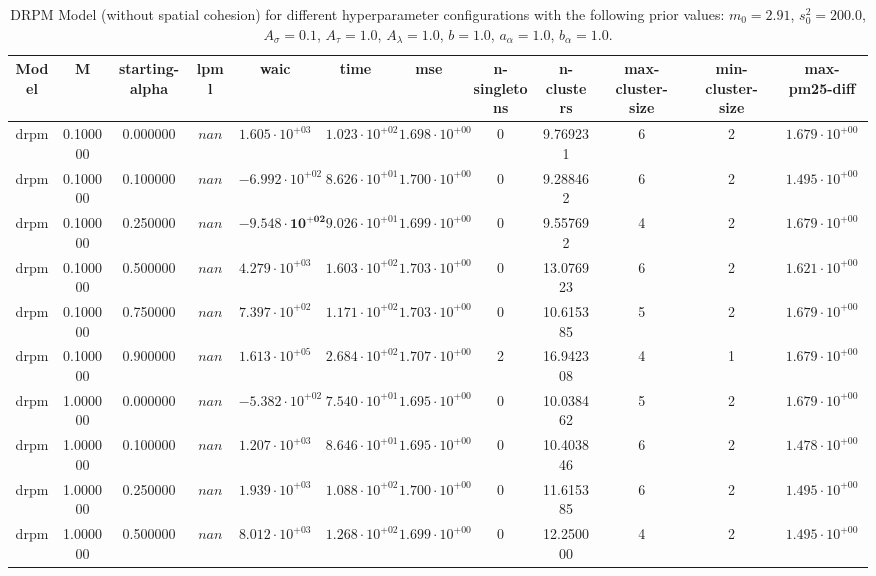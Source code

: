 \begin{table}
\caption{DRPM Model (without spatial cohesion) for different hyperparameter configurations with the following prior values: $m_0 = 2.91$, $s_0^2 = 200.0$, $A_\sigma = 0.1$, $A_\tau = 1.0$, $A_\lambda = 1.0$, $b = 1.0$, $a_\alpha = 1.0$, $b_\alpha = 1.0$.}
\centering\begin{tabular}{cccccccccccc}
\toprule
Model & M & starting-alpha & lpml & waic & time & mse & n-singletons & n-clusters & max-cluster-size & min-cluster-size & max-pm25-diff \\
\midrule
drpm & 0.100000 & 0.000000 & $nan$ & $1.605 \cdot 10^{+03}$ & $1.023 \cdot 10^{+02}$ & $1.698 \cdot 10^{+00}$ & 0 & 9.769231 & 6 & 2 & $1.679 \cdot 10^{+00}$ \\
drpm & 0.100000 & 0.100000 & $nan$ & $-6.992 \cdot 10^{+02}$ & $8.626 \cdot 10^{+01}$ & $1.700 \cdot 10^{+00}$ & 0 & 9.288462 & 6 & 2 & $1.495 \cdot 10^{+00}$ \\
drpm & 0.100000 & 0.250000 & $nan$ & $\mathbf{-9.548 \cdot 10^{+02}}$ & $9.026 \cdot 10^{+01}$ & $1.699 \cdot 10^{+00}$ & 0 & 9.557692 & 4 & 2 & $1.679 \cdot 10^{+00}$ \\
drpm & 0.100000 & 0.500000 & $nan$ & $4.279 \cdot 10^{+03}$ & $1.603 \cdot 10^{+02}$ & $1.703 \cdot 10^{+00}$ & 0 & 13.076923 & 6 & 2 & $1.621 \cdot 10^{+00}$ \\
drpm & 0.100000 & 0.750000 & $nan$ & $7.397 \cdot 10^{+02}$ & $1.171 \cdot 10^{+02}$ & $1.703 \cdot 10^{+00}$ & 0 & 10.615385 & 5 & 2 & $1.679 \cdot 10^{+00}$ \\
drpm & 0.100000 & 0.900000 & $nan$ & $1.613 \cdot 10^{+05}$ & $2.684 \cdot 10^{+02}$ & $1.707 \cdot 10^{+00}$ & 2 & 16.942308 & 4 & 1 & $1.679 \cdot 10^{+00}$ \\
drpm & 1.000000 & 0.000000 & $nan$ & $-5.382 \cdot 10^{+02}$ & $7.540 \cdot 10^{+01}$ & $1.695 \cdot 10^{+00}$ & 0 & 10.038462 & 5 & 2 & $1.679 \cdot 10^{+00}$ \\
drpm & 1.000000 & 0.100000 & $nan$ & $1.207 \cdot 10^{+03}$ & $8.646 \cdot 10^{+01}$ & $1.695 \cdot 10^{+00}$ & 0 & 10.403846 & 6 & 2 & $1.478 \cdot 10^{+00}$ \\
drpm & 1.000000 & 0.250000 & $nan$ & $1.939 \cdot 10^{+03}$ & $1.088 \cdot 10^{+02}$ & $1.700 \cdot 10^{+00}$ & 0 & 11.615385 & 6 & 2 & $1.495 \cdot 10^{+00}$ \\
drpm & 1.000000 & 0.500000 & $nan$ & $8.012 \cdot 10^{+03}$ & $1.268 \cdot 10^{+02}$ & $1.699 \cdot 10^{+00}$ & 0 & 12.250000 & 4 & 2 & $1.495 \cdot 10^{+00}$ \\

\end{tabular}
\end{table}
